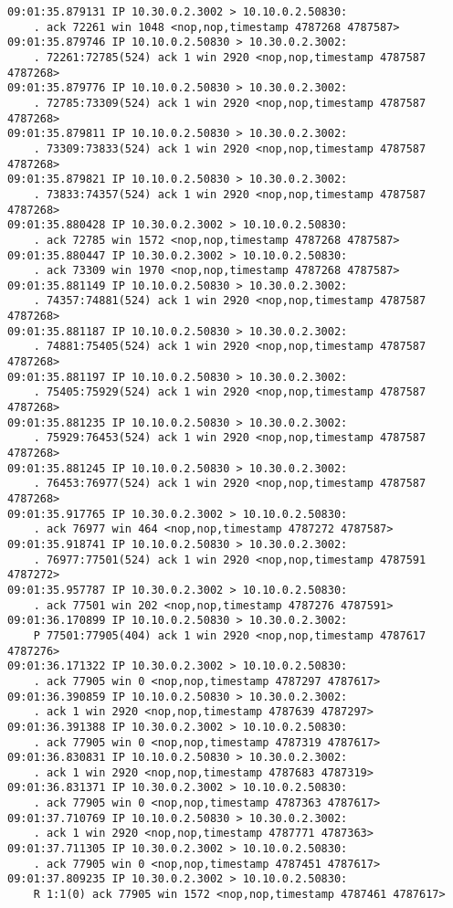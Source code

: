 \documentclass[a4paper,12pt]{article}
\begin{document}
\begin{Verbatim}
09:01:35.879131 IP 10.30.0.2.3002 > 10.10.0.2.50830: 
    . ack 72261 win 1048 <nop,nop,timestamp 4787268 4787587>
09:01:35.879746 IP 10.10.0.2.50830 > 10.30.0.2.3002: 
    . 72261:72785(524) ack 1 win 2920 <nop,nop,timestamp 4787587 4787268>
09:01:35.879776 IP 10.10.0.2.50830 > 10.30.0.2.3002: 
    . 72785:73309(524) ack 1 win 2920 <nop,nop,timestamp 4787587 4787268>
09:01:35.879811 IP 10.10.0.2.50830 > 10.30.0.2.3002: 
    . 73309:73833(524) ack 1 win 2920 <nop,nop,timestamp 4787587 4787268>
09:01:35.879821 IP 10.10.0.2.50830 > 10.30.0.2.3002: 
    . 73833:74357(524) ack 1 win 2920 <nop,nop,timestamp 4787587 4787268>
09:01:35.880428 IP 10.30.0.2.3002 > 10.10.0.2.50830: 
    . ack 72785 win 1572 <nop,nop,timestamp 4787268 4787587>
09:01:35.880447 IP 10.30.0.2.3002 > 10.10.0.2.50830: 
    . ack 73309 win 1970 <nop,nop,timestamp 4787268 4787587>
09:01:35.881149 IP 10.10.0.2.50830 > 10.30.0.2.3002: 
    . 74357:74881(524) ack 1 win 2920 <nop,nop,timestamp 4787587 4787268>
09:01:35.881187 IP 10.10.0.2.50830 > 10.30.0.2.3002: 
    . 74881:75405(524) ack 1 win 2920 <nop,nop,timestamp 4787587 4787268>
09:01:35.881197 IP 10.10.0.2.50830 > 10.30.0.2.3002: 
    . 75405:75929(524) ack 1 win 2920 <nop,nop,timestamp 4787587 4787268>
09:01:35.881235 IP 10.10.0.2.50830 > 10.30.0.2.3002: 
    . 75929:76453(524) ack 1 win 2920 <nop,nop,timestamp 4787587 4787268>
09:01:35.881245 IP 10.10.0.2.50830 > 10.30.0.2.3002: 
    . 76453:76977(524) ack 1 win 2920 <nop,nop,timestamp 4787587 4787268>
09:01:35.917765 IP 10.30.0.2.3002 > 10.10.0.2.50830: 
    . ack 76977 win 464 <nop,nop,timestamp 4787272 4787587>
09:01:35.918741 IP 10.10.0.2.50830 > 10.30.0.2.3002: 
    . 76977:77501(524) ack 1 win 2920 <nop,nop,timestamp 4787591 4787272>
09:01:35.957787 IP 10.30.0.2.3002 > 10.10.0.2.50830: 
    . ack 77501 win 202 <nop,nop,timestamp 4787276 4787591>
09:01:36.170899 IP 10.10.0.2.50830 > 10.30.0.2.3002: 
    P 77501:77905(404) ack 1 win 2920 <nop,nop,timestamp 4787617 4787276>
09:01:36.171322 IP 10.30.0.2.3002 > 10.10.0.2.50830: 
    . ack 77905 win 0 <nop,nop,timestamp 4787297 4787617>
09:01:36.390859 IP 10.10.0.2.50830 > 10.30.0.2.3002: 
    . ack 1 win 2920 <nop,nop,timestamp 4787639 4787297>
09:01:36.391388 IP 10.30.0.2.3002 > 10.10.0.2.50830: 
    . ack 77905 win 0 <nop,nop,timestamp 4787319 4787617>
09:01:36.830831 IP 10.10.0.2.50830 > 10.30.0.2.3002: 
    . ack 1 win 2920 <nop,nop,timestamp 4787683 4787319>
09:01:36.831371 IP 10.30.0.2.3002 > 10.10.0.2.50830: 
    . ack 77905 win 0 <nop,nop,timestamp 4787363 4787617>
09:01:37.710769 IP 10.10.0.2.50830 > 10.30.0.2.3002: 
    . ack 1 win 2920 <nop,nop,timestamp 4787771 4787363>
09:01:37.711305 IP 10.30.0.2.3002 > 10.10.0.2.50830: 
    . ack 77905 win 0 <nop,nop,timestamp 4787451 4787617>
09:01:37.809235 IP 10.30.0.2.3002 > 10.10.0.2.50830: 
    R 1:1(0) ack 77905 win 1572 <nop,nop,timestamp 4787461 4787617>
\end{Verbatim}
\end{document}
